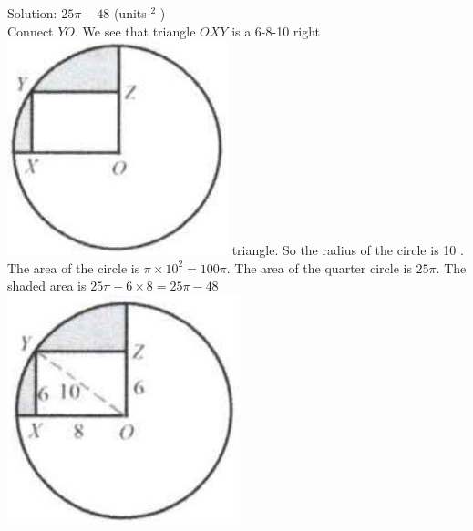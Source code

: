 \documentclass[10pt]{article}
\begin{document}
Solution: \(25 \pi-48\) (units \({ }^{2}\) )\\
Connect \(Y O\). We see that triangle \(O X Y\) is a 6-8-10 right\\
\includegraphics[max width=\textwidth]{2025_04_17_97bc1f7e44d93c271a88g-150} triangle. So the radius of the circle is 10 . The area of the circle is \(\pi \times 10^{2}=100 \pi\). The area of the quarter circle is \(25 \pi\). The shaded area is \(25 \pi-6 \times 8=25 \pi-48\)\\
\includegraphics[max width=\textwidth, center]{2025_04_17_97bc1f7e44d93c271a88g-150(3)}
\end{document}
